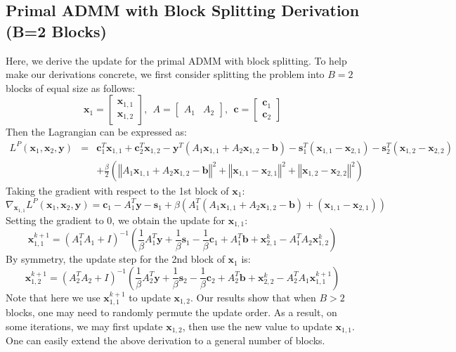 \documentclass{article}
\begin{document}
\subsection*{Primal ADMM with Block Splitting Derivation (B=2 Blocks)}
Here, we derive the update for the primal ADMM with block splitting. To help make our derivations concrete, we first consider splitting the problem into $B=2$ blocks of equal size as follows:
\[
\mathbf{x}_{1}=\begin{bmatrix}\mathbf{x}_{1,1}\\
\mathbf{x}_{1,2}
\end{bmatrix},
 \ \  
A=\begin{bmatrix}A_{1} & A_{2}\end{bmatrix},
\ \ 
\mathbf{c}=\begin{bmatrix}\mathbf{c}_{1}\\
\mathbf{c}_{2}
\end{bmatrix}
\]
Then the Lagrangian can be expressed as:
\begin{eqnarray*}
L^{P}(\mathbf{x}_{1},\mathbf{x}_{2},\mathbf{y}) & = & \mathbf{c}_{1}^{T}\mathbf{x}_{1,1}+\mathbf{c}_{2}^{T}\mathbf{x}_{1,2}-\mathbf{y}^{T}\left(A_{1}\mathbf{x}_{1,1}+A_{2}\mathbf{x}_{1,2}-\mathbf{b}\right)-\mathbf{s}_{1}^{T}\left(\mathbf{x}_{1,1}-\mathbf{x}_{2,1}\right)-\mathbf{s}_{2}^{T}\left(\mathbf{x}_{1,2}-\mathbf{x}_{2,2}\right)\\
 &  & +\frac{\beta}{2}\left(\left\Vert A_{1}\mathbf{x}_{1,1}+A_{2}\mathbf{x}_{1,2}-\mathbf{b}\right\Vert ^{2}+\left\Vert \mathbf{x}_{1,1}-\mathbf{x}_{2,1}\right\Vert ^{2}+\left\Vert \mathbf{x}_{1,2}-\mathbf{x}_{2,2}\right\Vert ^{2}\right)
\end{eqnarray*}
Taking the gradient with respect to the 1st block of $\mathbf{x}_{1}$:
\[
\nabla_{\mathbf{x}_{1,1}}L^{P}(\mathbf{x}_{1},\mathbf{x}_{2},\mathbf{y})=\mathbf{c}_{1}-A_{1}^{T}\mathbf{y}-\mathbf{s}_{1}+\beta\left(A_{1}^{T}\left(A_{1}\mathbf{x}_{1,1}+A_{2}\mathbf{x}_{1,2}-\mathbf{b}\right)+\left(\mathbf{x}_{1,1}-\mathbf{x}_{2,1}\right)\right)
\]
Setting the gradient to 0, we obtain the update for $\mathbf{x}_{1,1}$:
\[
\mathbf{x}_{1,1}^{k+1}=\left(A_{1}^{T}A_{1}+I\right)^{-1}\left(\frac{1}{\beta}A_{1}^{T}\mathbf{y}+\frac{1}{\beta}\mathbf{s}_{1}-\frac{1}{\beta}\mathbf{c}_{1}+A_{1}^{T}\mathbf{b}+\mathbf{x}_{2,1}^{k}-A_{1}^{T}A_{2}\mathbf{x}_{1,2}^{k}\right)
\]
By symmetry, the update step for the 2nd block of $\mathbf{x}_{1}$
is:
\[
\mathbf{x}_{1,2}^{k+1}=\left(A_{2}^{T}A_{2}+I\right)^{-1}\left(\frac{1}{\beta}A_{2}^{T}\mathbf{y}+\frac{1}{\beta}\mathbf{s}_{2}-\frac{1}{\beta}\mathbf{c}_{2}+A_{2}^{T}\mathbf{b}+\mathbf{x}_{2,2}^{k}-A_{2}^{T}A_{1}\mathbf{x}_{1,1}^{k+1}\right)
\]
Note that here we use $\mathbf{x}_{1,1}^{k+1}$ to update $\mathbf{x}_{1,2}$. Our results show that when $B>2$ blocks, one may need to randomly permute the update order. As a result, on some iterations, we may first update $\mathbf{x}_{1,2}$, then use the new value to update $\mathbf{x}_{1,1}$. One can easily extend the above derivation to a general number of blocks.  
\end{document}
